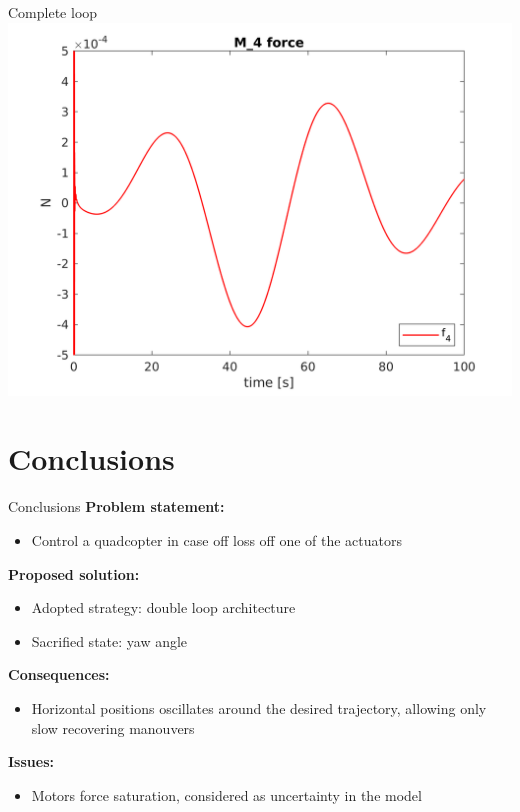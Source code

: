 \begin{frame}[fragile]{Complete loop}
  \includegraphics[width=\textwidth]{../report/Images/r4force}
\end{frame}




\section{Conclusions}
\begin{frame}[fragile]{Conclusions }
  \color{LightBlue}
  \textbf{Problem statement:} 
  \color{Black}
  \begin{itemize}
  \item
    Control a quadcopter in case off loss off one of the actuators
  \end{itemize}

  \color{LightBlue}
  \textbf{Proposed solution:}  
  \color{Black}
  \begin{itemize}
  \item
    Adopted strategy: \color{Orange}double loop \color{Black}architecture
  \item
    Sacrified state: yaw angle
  \end{itemize}

  \color{LightBlue}
  \textbf{Consequences:}
  \color{Black}
  \begin{itemize}
  \item
    Horizontal positions oscillates around the desired trajectory, allowing only
    slow recovering manouvers
  \end{itemize}

  \color{LightBlue}
  \textbf{Issues:}
  \color{Black}
  \begin{itemize}
  \item
    Motors force saturation, considered as uncertainty in the model
  \end{itemize}

\end{frame}

